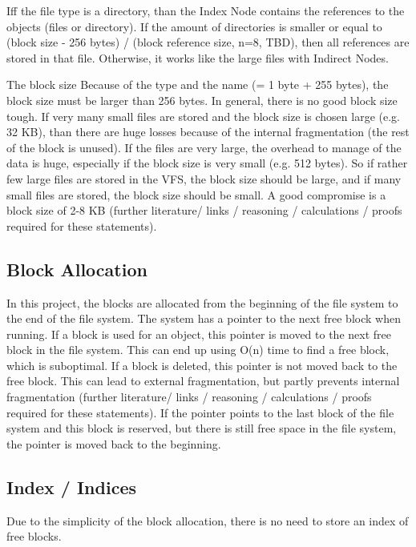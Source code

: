 \documentclass[a4paper,12pt]{article}
\begin{document}
Iff the file type is a directory, than the Index Node contains the references to the objects (files or directory). If the amount of directories is smaller or equal to (block size - 256 bytes) / (block reference size, n=8, TBD), 
then all references are stored in that file. Otherwise, it works like the large files with Indirect Nodes.

The block size
Because of the type and the name (= 1 byte + 255 bytes), the block size must be larger than 256 bytes. In general, there is no good block size tough. If very many small files are stored and the block size is chosen 
large (e.g. 32 KB), than there are huge losses because of the internal fragmentation (the rest of the block is unused). If the files are very large, the overhead to manage of the data is huge, especially if the
block size is very small (e.g. 512 bytes). So if rather few large files are stored in the VFS, the block size should be large, and if many small files are stored, the block size should be small. A good compromise is
a block size of 2-8 KB (further literature/ links / reasoning / calculations / proofs required for these statements).

\subsection{Block Allocation}

In this project, the blocks are allocated from the beginning of the file system to the end of the file system. The system has a pointer to the next free block when running. If a block is used for an object, this pointer is moved
to the next free block in the file system. This can end up using O(n) time to find a free block, which is suboptimal. If a block is deleted,
this pointer is not moved back to the free block. This can lead to external fragmentation, but partly prevents internal fragmentation (further literature/ links / reasoning / calculations / 
proofs required for these statements). If the pointer points to the last block of the file system and this block is reserved, but there is still free space in the file system, the pointer is moved back to the beginning.

\subsection{Index / Indices}

Due to the simplicity of the block allocation, there is no need to store an index of free blocks.
\end{document}
